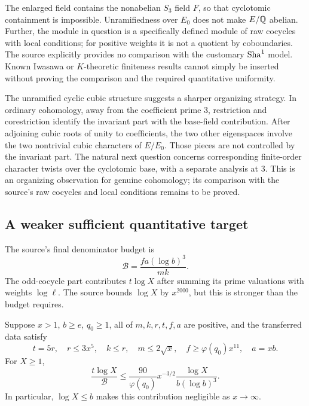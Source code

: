 The enlarged field contains the nonabelian $S_3$ field $F$, so that cyclotomic containment is impossible. Unramifiedness over $E_0$ does not make $E/\mathbb Q$ abelian. Further, the module in question is a specifically defined module of raw cocycles with local conditions; for positive weights it is not a quotient by coboundaries. The source explicitly provides no comparison with the customary $\mathrm{Sha}^1$ model. Known Iwasawa or $K$-theoretic finiteness results cannot simply be inserted without proving the comparison and the required quantitative uniformity.\cite{oddSha,selmerModules}

The unramified cyclic cubic structure suggests a sharper organizing strategy. In ordinary cohomology, away from the coefficient prime $3$, restriction and corestriction identify the invariant part with the base-field contribution. After adjoining cubic roots of unity to coefficients, the two other eigenspaces involve the two nontrivial cubic characters of $E/E_0$. Those pieces are not controlled by the invariant part. The natural next question concerns corresponding finite-order character twists over the cyclotomic base, with a separate analysis at $3$. This is an organizing observation for genuine cohomology; its comparison with the source's raw cocycles and local conditions remains to be proved.

\subsection{A weaker sufficient quantitative target}

The source's final denominator budget is
\begin{equation}\label{eq:budget}
 \mathcal B=\frac{fa(\log b)^3}{mk}.
\end{equation}
The odd-cocycle part contributes $t\log X$ after summing its prime valuations with weights $\log\ell$. The source bounds $\log X$ by $x^{2000}$, but this is stronger than the budget requires.\cite{fitTwists,traceRelations}

\begin{proposition}\label{prop:budget}
Suppose $x>1$, $b\ge e$, $q_0\ge1$, all of $m,k,r,t,f,a$ are positive, and the transferred data satisfy
\[
 t=5r,\quad r\le3x^5,\quad k\le r,\quad m\le2\sqrt x,
 \quad f\ge\varphi(q_0)x^{11},\quad a=xb.
\]
For $X\ge1$,
\begin{equation}\label{eq:budget-ratio}
 \frac{t\log X}{\mathcal B}
 \le \frac{90}{\varphi(q_0)}x^{-3/2}
 \frac{\log X}{b(\log b)^3}.
\end{equation}
In particular, $\log X\le b$ makes this contribution negligible as $x\to\infty$.
\end{proposition}

